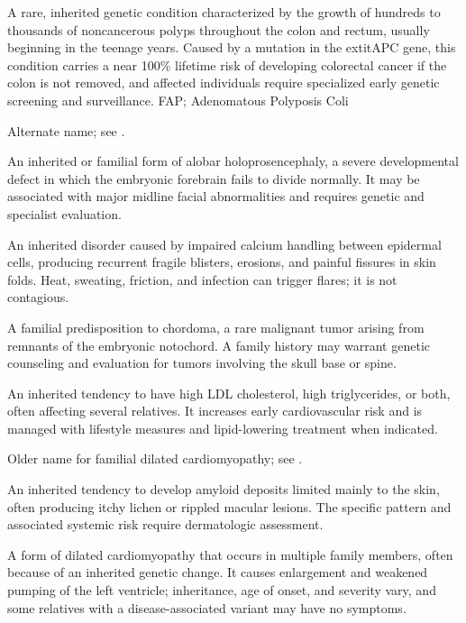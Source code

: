  A rare, inherited genetic condition characterized by the growth of hundreds to thousands of noncancerous polyps throughout the colon and rectum, usually beginning in the teenage years. Caused by a mutation in the  extit{APC} gene, this condition carries a near 100\% lifetime risk of developing colorectal cancer if the colon is not removed, and affected individuals require specialized early genetic screening and surveillance.
\synonyms
FAP; Adenomatous Polyposis Coli

 Alternate name; see
  .

 An inherited or familial form of alobar holoprosencephaly, a severe developmental defect in which the embryonic forebrain fails to divide normally. It may be associated with major midline facial abnormalities and requires genetic and specialist evaluation.

 An inherited disorder caused by impaired calcium handling between epidermal cells, producing recurrent fragile blisters, erosions, and painful fissures in skin folds. Heat, sweating, friction, and infection can trigger flares; it is not contagious.

 A familial predisposition to chordoma, a rare malignant tumor arising from remnants of the embryonic notochord. A family history may warrant genetic counseling and evaluation for tumors involving the skull base or spine.

 An inherited tendency to have high LDL cholesterol, high triglycerides, or both, often affecting several relatives. It increases early cardiovascular risk and is managed with lifestyle measures and lipid-lowering treatment when indicated.

 Older name for familial dilated cardiomyopathy; see .

 An inherited tendency to develop amyloid deposits limited mainly to the skin, often producing itchy lichen or rippled macular lesions. The specific pattern and associated systemic risk require dermatologic assessment.

 A form of dilated cardiomyopathy that occurs in multiple family members, often because of an inherited genetic change. It causes enlargement and weakened pumping of the left ventricle; inheritance, age of onset, and severity vary, and some relatives with a disease-associated variant may have no symptoms.

